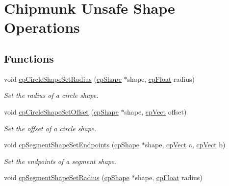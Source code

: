 \hypertarget{group__unsafe}{\section{Chipmunk Unsafe Shape Operations}
\label{group__unsafe}
}
\subsection*{Functions}
\begin{DoxyCompactItemize}
\item 
\hypertarget{group__unsafe_ga465d54119557ea9e323d3a0c27d05a76}{void \hyperlink{group__unsafe_ga465d54119557ea9e323d3a0c27d05a76}{cp\-Circle\-Shape\-Set\-Radius} (\hyperlink{structcp_shape}{cp\-Shape} $\ast$shape, \hyperlink{group__basic_types_gac1ed65573e035bf892505768c852d8d3}{cp\-Float} radius)}\label{group__unsafe_ga465d54119557ea9e323d3a0c27d05a76}

\begin{DoxyCompactList}\small\item\em Set the radius of a circle shape. \end{DoxyCompactList}\item 
\hypertarget{group__unsafe_gaa68bf4f38f35f823dc06131f3efb6990}{void \hyperlink{group__unsafe_gaa68bf4f38f35f823dc06131f3efb6990}{cp\-Circle\-Shape\-Set\-Offset} (\hyperlink{structcp_shape}{cp\-Shape} $\ast$shape, \hyperlink{structcp_vect}{cp\-Vect} offset)}\label{group__unsafe_gaa68bf4f38f35f823dc06131f3efb6990}

\begin{DoxyCompactList}\small\item\em Set the offset of a circle shape. \end{DoxyCompactList}\item 
\hypertarget{group__unsafe_ga793be86c47ec436816cb306fc6ba7fbe}{void \hyperlink{group__unsafe_ga793be86c47ec436816cb306fc6ba7fbe}{cp\-Segment\-Shape\-Set\-Endpoints} (\hyperlink{structcp_shape}{cp\-Shape} $\ast$shape, \hyperlink{structcp_vect}{cp\-Vect} a, \hyperlink{structcp_vect}{cp\-Vect} b)}\label{group__unsafe_ga793be86c47ec436816cb306fc6ba7fbe}

\begin{DoxyCompactList}\small\item\em Set the endpoints of a segment shape. \end{DoxyCompactList}\item 
\hypertarget{group__unsafe_ga26a6401be76f5299dfc029c54954ce04}{void \hyperlink{group__unsafe_ga26a6401be76f5299dfc029c54954ce04}{cp\-Segment\-Shape\-Set\-Radius} (\hyperlink{structcp_shape}{cp\-Shape} $\ast$shape, \hyperlink{group__basic_types_gac1ed65573e035bf892505768c852d8d3}{cp\-Float} radius)}\label{group__unsafe_ga26a6401be76f5299dfc029c54954ce04}


\end{DoxyCompactItemize}
